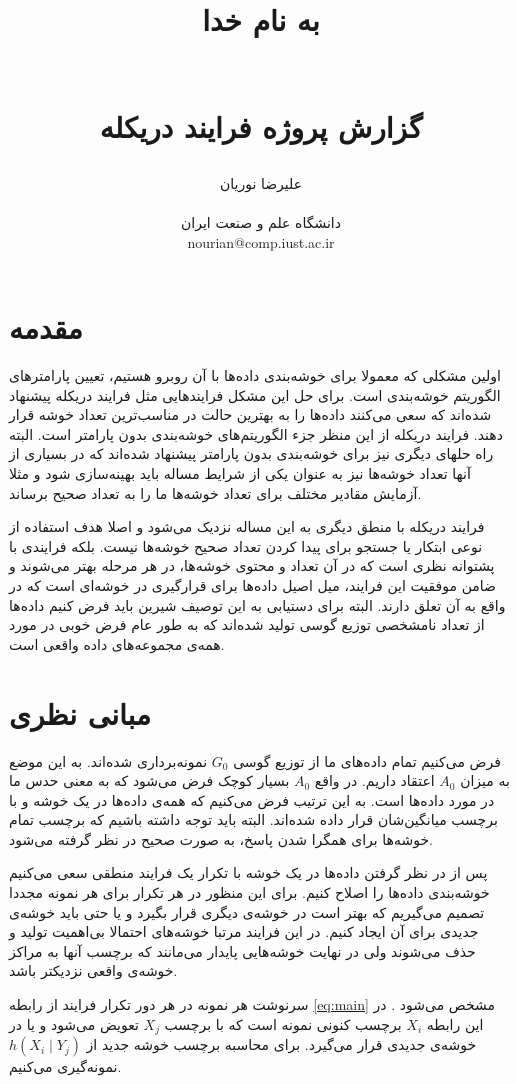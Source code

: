 \documentclass{article}
\title{ 
\begin{normalsize} به نام خدا \end{normalsize}
\\[2cm]
 گزارش پروژه فرایند دریکله
}
\author{علیرضا نوریان
\\
\\ \small دانشگاه علم و صنعت ایران
\\ \small nourian@comp.iust.ac.ir
}
\begin{document}
\maketitle

\section{مقدمه}
اولین مشکلی که معمولا برای خوشه‌بندی داده‌ها با آن روبرو هستیم، تعیین پارامترهای الگوریتم خوشه‌بندی است. برای حل این مشکل فرایندهایی مثل فرایند دریکله پیشنهاد شده‌اند که سعی می‌کنند داده‌ها را به بهترین حالت در مناسب‌ترین تعداد خوشه قرار دهند. فرایند دریکله از این منظر جزء الگوریتم‌های خوشه‌بندی بدون پارامتر است. البته راه حلهای دیگری نیز برای خوشه‌بندی بدون پارامتر پیشنهاد شده‌اند که در بسیاری از آنها تعداد خوشه‌ها نیز به عنوان یکی از شرایط مساله باید بهینه‌سازی شود و مثلا آزمایش مقادیر مختلف برای تعداد خوشه‌ها ما را به تعداد صحیح برساند.

فرایند دریکله با منطق دیگری به این مساله نزدیک می‌شود و اصلا هدف استفاده از نوعی ابتکار یا جستجو برای پیدا کردن تعداد صحیح خوشه‌ها نیست. بلکه فرایندی با پشتوانه نظری است که در آن تعداد و محتوی خوشه‌ها، در هر مرحله بهتر می‌شوند و ضامن موفقیت این فرایند، میل اصیل  داده‌ها برای قرارگیری در خوشه‌ای است که در واقع به آن تعلق دارند. البته برای دستیابی به این توصیف شیرین باید فرض کنیم داده‌ها از تعداد نامشخصی توزیع گوسی تولید شده‌اند که به طور عام فرض خوبی در مورد همه‌ی مجموعه‌های داده واقعی است.

\section{مبانی نظری}
فرض می‌کنیم تمام داده‌های ما از توزیع گوسی $G_0$ نمونه‌برداری شده‌اند. به این موضع به میزان $A_0$ اعتقاد داریم. در واقع $A_0$ بسیار کوچک فرض می‌شود که به معنی حدس ما در مورد داده‌ها است. به این ترتیب فرض می‌کنیم که همه‌ی داده‌ها در یک خوشه و با برچسب میانگین‌شان قرار داده شده‌اند. البته باید توجه داشته باشیم که برچسب تمام خوشه‌ها برای همگرا شدن پاسخ، به صورت صحیح در نظر گرفته می‌شود.

پس از در نظر گرفتن داده‌ها در یک خوشه با تکرار یک فرایند منطقی سعی می‌کنیم خوشه‌بندی داده‌ها را اصلاح کنیم. برای این منظور در هر تکرار برای هر نمونه مجددا تصمیم می‌گیریم که بهتر است در خوشه‌ی دیگری قرار بگیرد و یا حتی باید خوشه‌ی جدیدی برای آن ایجاد کنیم. در این فرایند مرتبا خوشه‌های احتمالا بی‌اهمیت تولید و حذف می‌شوند ولی در نهایت خوشه‌هایی پایدار می‌مانند که برچسب آنها به مراکز خوشه‌ی واقعی نزدیکتر باشد.

سرنوشت هر نمونه در هر دور تکرار فرایند از رابطه \ref{eq:main} مشخص می‌شود \cite{dirichlet-process}. در این رابطه $X_i$ برچسب کنونی نمونه است که با برچسب $X_j$ تعویض می‌شود و یا در خوشه‌ی جدیدی قرار می‌گیرد.  برای محاسبه برچسب خوشه جدید از $h(X_i \mid Y_j)$ نمونه‌گیری می‌کنیم.
\end{document}
